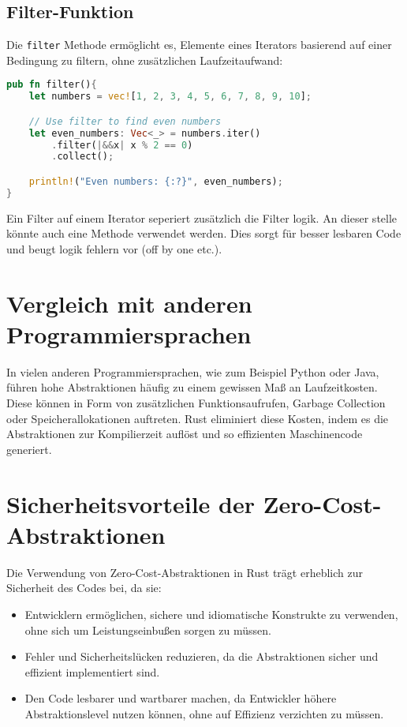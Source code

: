 \subsection{Filter-Funktion}

Die \texttt{filter} Methode ermöglicht es, Elemente eines Iterators basierend auf einer Bedingung zu filtern, ohne zusätzlichen Laufzeitaufwand:

\begin{lstlisting}[language=Rust, caption=Filter-Funktion Beispiel]
pub fn filter(){
    let numbers = vec![1, 2, 3, 4, 5, 6, 7, 8, 9, 10];

    // Use filter to find even numbers
    let even_numbers: Vec<_> = numbers.iter()
        .filter(|&&x| x % 2 == 0)
        .collect();

    println!("Even numbers: {:?}", even_numbers);
}
\end{lstlisting}
Ein Filter auf einem Iterator seperiert zusätzlich die Filter logik.
An dieser stelle könnte auch eine Methode verwendet werden.
Dies sorgt für besser lesbaren Code und beugt logik fehlern vor (off by one etc.).
\section{Vergleich mit anderen Programmiersprachen}

In vielen anderen Programmiersprachen, wie zum Beispiel Python oder Java, führen hohe Abstraktionen häufig zu einem gewissen Maß an Laufzeitkosten. 
Diese können in Form von zusätzlichen Funktionsaufrufen, Garbage Collection oder Speicherallokationen auftreten. 
Rust eliminiert diese Kosten, indem es die Abstraktionen zur Kompilierzeit auflöst und so effizienten Maschinencode generiert.

\section{Sicherheitsvorteile der Zero-Cost-Abstraktionen}

Die Verwendung von Zero-Cost-Abstraktionen in Rust trägt erheblich zur Sicherheit des Codes bei, da sie:
\begin{itemize}
    \item Entwicklern ermöglichen, sichere und idiomatische Konstrukte zu verwenden, ohne sich um Leistungseinbußen sorgen zu müssen.
    \item Fehler und Sicherheitslücken reduzieren, da die Abstraktionen sicher und effizient implementiert sind.
    \item Den Code lesbarer und wartbarer machen, da Entwickler höhere Abstraktionslevel nutzen können, ohne auf Effizienz verzichten zu müssen.
\end{itemize}
